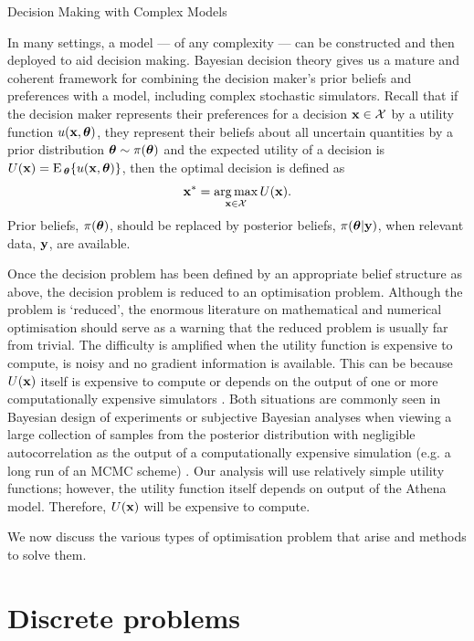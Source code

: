 
\begin{chapter}{Decision Making with Complex Models \label{Chap:optimisation}}

In many settings, a model --- of any complexity --- can be constructed and then deployed to aid decision making. Bayesian decision theory gives us a mature and coherent framework for combining the decision maker's prior beliefs and preferences with a model, including complex stochastic simulators. Recall that if the decision maker represents their preferences for a decision $\mathbf{x} \in \mathcal{X}$ by a utility function $u(\mathbf{x}, \bm{\theta})$, they represent their beliefs about all uncertain quantities by a prior distribution $\bm{\theta} \sim \pi(\bm{\theta})$ and the expected utility of a decision is $U(\mathbf{x}) = \textrm{E}\,_{\bm{\theta}} \{ u(\mathbf{x}, \bm{\theta}) \}$, then the optimal decision is defined as
\begin{equation}
 \mathbf{x}^{*} = \operatorname*{arg\,max}_{\mathbf{x} \in \mathcal{X}} U(\mathbf{x}).
\end{equation}
Prior beliefs, $\pi(\bm{\theta})$, should be replaced by posterior beliefs, $\pi(\bm{\theta} | \mathbf{y})$, when relevant data, $\mathbf{y}$, are available.

Once the decision problem has been defined by an appropriate belief structure as above, the decision problem is reduced to an optimisation problem. Although the problem is `reduced', the enormous literature on mathematical and numerical optimisation should serve as a warning that the reduced problem is usually far from trivial. The difficulty is amplified when the utility function is expensive to compute, is noisy and no gradient information is available. This can be because $U(\mathbf{x})$ itself is expensive to compute or depends on the output of one or more computationally expensive simulators \citep{Williamson2012}. Both situations are commonly seen in Bayesian design of experiments or subjective Bayesian analyses when viewing a large collection of samples from the posterior distribution with negligible autocorrelation as the output of a computationally expensive simulation (e.g. a long run of an MCMC scheme) \citep{Ryan2016, Vernon2022bayes}. Our analysis will use relatively simple utility functions; however, the utility function itself depends on output of the Athena model. Therefore, $U(\mathbf{x})$ will be expensive to compute.

We now discuss the various types of optimisation problem that arise and methods to solve them.

\section{Discrete problems}

\end{chapter}
